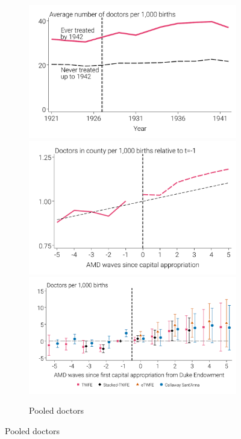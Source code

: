 \documentclass[12pt]{article}
\begin{document}
\newpage
{}
\begin{landscape}
\begin{figure}
    \caption[Physician supply by treatment status, quality, and event time.]{Physician supply by treatment status, quality, and event time.}
    \centering
    \begin{minipage}{\linewidth}
    \begin{subfigure}[b]{0.27\columnwidth}
        \centering
        \caption{{Pooled doctors}}\label{fig:md-pool-all}
        \includegraphics[width=\linewidth]{../analysis/output/main/figure_3a1_pooled_rMD_by_treat_status.pdf}
        \includegraphics[width=\linewidth]{../analysis/output/main/figure_3a2_pooled_rMD_by_event_time.pdf}
        \includegraphics[width=\linewidth]{../analysis/output/main/figure_3a3_pooled_rMD_first_stage.pdf}

\end{subfigure}
\end{minipage}
\end{figure}
\end{landscape}
\end{document}
